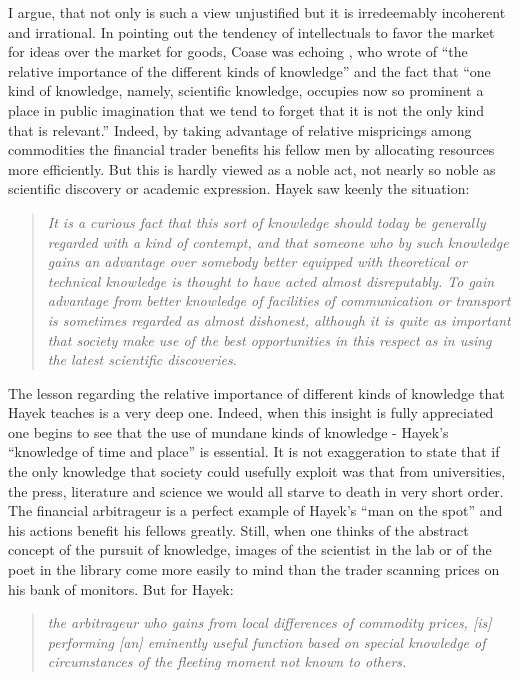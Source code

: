 \documentclass[11pt,]{article}
\begin{document}
I argue, that not only is such a view unjustified but it is irredeemably
incoherent and irrational. In pointing out the tendency of intellectuals
to favor the market for ideas over the market for goods, Coase was
echoing \citet{Hayek1945}, who wrote of ``the relative importance of the
different kinds of knowledge'' and the fact that ``one kind of
knowledge, namely, scientific knowledge, occupies now so prominent a
place in public imagination that we tend to forget that it is not the
only kind that is relevant.'' Indeed, by taking advantage of relative
mispricings among commodities the financial trader benefits his fellow
men by allocating resources more efficiently. But this is hardly viewed
as a noble act, not nearly so noble as scientific discovery or academic
expression. Hayek saw keenly the situation:

\begin{quote}
\emph{It is a curious fact that this sort of knowledge should today be
generally regarded with a kind of contempt, and that someone who by such
knowledge gains an advantage over somebody better equipped with
theoretical or technical knowledge is thought to have acted almost
disreputably. To gain advantage from better knowledge of facilities of
communication or transport is sometimes regarded as almost dishonest,
although it is quite as important that society make use of the best
opportunities in this respect as in using the latest scientific
discoveries.}
\end{quote}

The lesson regarding the relative importance of different kinds of
knowledge that Hayek teaches is a very deep one. Indeed, when this
insight is fully appreciated one begins to see that the use of mundane
kinds of knowledge - Hayek's ``knowledge of time and place'' is
essential. It is not exaggeration to state that if the only knowledge
that society could usefully exploit was that from universities, the
press, literature and science we would all starve to death in very short
order. The financial arbitrageur is a perfect example of Hayek's ``man
on the spot'' and his actions benefit his fellows greatly. Still, when
one thinks of the abstract concept of the pursuit of knowledge, images
of the scientist in the lab or of the poet in the library come more
easily to mind than the trader scanning prices on his bank of monitors.
But for Hayek:

\begin{quote}
\emph{the arbitrageur who gains from local differences of commodity
prices, {[}is{]} performing {[}an{]} eminently useful function based on
special knowledge of circumstances of the fleeting moment not known to
others.}
\end{quote}
\end{document}
